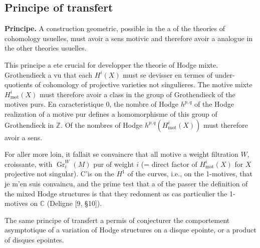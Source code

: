 \documentclass[11pt,a4paper]{article}
\theoremstyle{plain}
\theoremstyle{definition}
\DeclareMathOperator{\Gr}{Gr}
\newcommand{\Z}{\mathbb{Z}}
\newcommand{\C}{\mathbb{C}}
\DeclareMathOperator{\mot}{mot}
\begin{document}
\subsection{Principe of transfert}

\textbf{Principe.} A construction geometric, possible in the a of the theories of cohomology usuelles, must avoir a sens motivic and therefore avoir a analogue in the other theories usuelles.

This principe a ete crucial for developper the theorie of Hodge mixte. Grothendieck a vu that each $H^i(X)$ must se devisser en termes of under-quotients of cohomology of projective varieties not singulieres. The motive mixte $H^i_{\mot}(X)$ must therefore avoir a class in the group of Grothendieck of the motives purs. En caracteristique $0$, the nombre of Hodge $h^{p,q}$ of the Hodge realization of a motive pur defines a homomorphisme of this group of Grothendieck in $\Z$. Of the nombres of Hodge $h^{p,q}(H^i_{\mot}(X))$ must therefore avoir a sens.

For aller more loin, it fallait se convaincre that all motive a weight filtration $W$, croissante, with $\Gr_i^W(M)$ pur of weight $i$ (= direct factor of $H^i_{\mot}(X)$ for $X$ projective not singular). C'is on the $H^1$ of the curves, i.e., on the 1-motives, that je m'en suis convaincu, and the prime test that a of the passer the definition of the mixed Hodge structures is that they redonnent as cas particulier the 1-motives on $\C$ (Deligne [9, \S10]).

The same principe of transfert a permis of conjecturer the comportement asymptotique of a variation of Hodge structures on a disque epointe, or a product of disques epointes.
\end{document}
